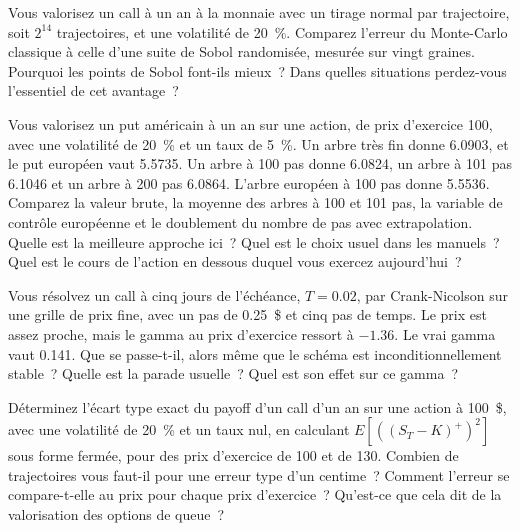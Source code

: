 \begin{question}\label{iq:iv2:pricing-and-numerics:44}
Vous valorisez un call à un an à la monnaie avec un tirage normal par trajectoire, soit $2^{14}$ trajectoires, et une volatilité de 20~\%. Comparez l'erreur du Monte-Carlo classique à celle d'une suite de Sobol randomisée, mesurée sur vingt graines. Pourquoi les points de Sobol font-ils mieux~? Dans quelles situations perdez-vous l'essentiel de cet avantage~?
\end{question}

\begin{question}\label{iq:iv2:pricing-and-numerics:45}
Vous valorisez un put américain à un an sur une action, de prix d'exercice 100, avec une volatilité de 20~\% et un taux de 5~\%. Un arbre très fin donne 6.0903, et le put européen vaut 5.5735. Un arbre à 100 pas donne 6.0824, un arbre à 101 pas 6.1046 et un arbre à 200 pas 6.0864. L'arbre européen à 100 pas donne 5.5536. Comparez la valeur brute, la moyenne des arbres à 100 et 101 pas, la variable de contrôle européenne et le doublement du nombre de pas avec extrapolation. Quelle est la meilleure approche ici~? Quel est le choix usuel dans les manuels~? Quel est le cours de l'action en dessous duquel vous exercez aujourd'hui~?
\end{question}

\begin{question}\label{iq:iv2:pricing-and-numerics:46}
Vous résolvez un call à cinq jours de l'échéance, $T = 0.02$, par Crank-Nicolson sur une grille de prix fine, avec un pas de 0.25~\$ et cinq pas de temps. Le prix est assez proche, mais le gamma au prix d'exercice ressort à $-1.36$. Le vrai gamma vaut 0.141. Que se passe-t-il, alors même que le schéma est inconditionnellement stable~? Quelle est la parade usuelle~? Quel est son effet sur ce gamma~?
\end{question}

\begin{question}\label{iq:iv2:pricing-and-numerics:47}
Déterminez l'écart type exact du payoff d'un call d'un an sur une action à 100~\$, avec une volatilité de 20~\% et un taux nul, en calculant $E[((S_T - K)^+)^2]$ sous forme fermée, pour des prix d'exercice de 100 et de 130. Combien de trajectoires vous faut-il pour une erreur type d'un centime~? Comment l'erreur se compare-t-elle au prix pour chaque prix d'exercice~? Qu'est-ce que cela dit de la valorisation des options de queue~?
\end{question}


